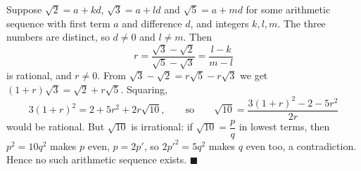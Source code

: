 Suppose $\sqrt2=a+kd$, $\sqrt3=a+ld$ and $\sqrt5=a+md$ for some arithmetic sequence with first term $a$ and difference $d$, and integers $k,l,m$. The three numbers are distinct, so $d\ne0$ and $l\ne m$. Then
\[r=\dfrac{\sqrt3-\sqrt2}{\sqrt5-\sqrt3}=\dfrac{l-k}{m-l}\]
is rational, and $r\ne0$. From $\sqrt3-\sqrt2=r\sqrt5-r\sqrt3$ we get $(1+r)\sqrt3=\sqrt2+r\sqrt5$. Squaring,
\[3(1+r)^2=2+5r^2+2r\sqrt{10},\qquad\text{so}\qquad\sqrt{10}=\dfrac{3(1+r)^2-2-5r^2}{2r}\]
would be rational. But $\sqrt{10}$ is irrational: if $\sqrt{10}=\dfrac pq$ in lowest terms, then $p^2=10q^2$ makes $p$ even, $p=2p'$, so $2p'^2=5q^2$ makes $q$ even too, a contradiction. Hence no such arithmetic sequence exists. $\blacksquare$
